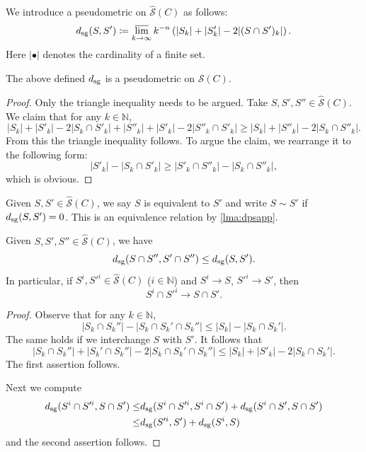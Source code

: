We introduce a pseudometric on $\hat{\mathcal{S}}(C)$ as follows:
\begin{equation}\label{eq:dsgdefapp}
d_{\mathrm{sg}}(S,S')\coloneqq \varlimsup_{k\to\infty} k^{-n} \left(|S_k|+|S'_k|-2|(S\cap S')_k|\right).
\end{equation}
Here $|\bullet|$ denotes the cardinality of a finite set.
\begin{lemma}\label{lma:dpsapp}
    The above defined $d_{\mathrm{sg}}$ is a pseudometric on $\hat{\mathcal{S}}(C)$.
\end{lemma}
\begin{proof}
    Only the triangle inequality needs to be argued. Take $S,S',S''\in \hat{\mathcal{S}}(C)$. We claim that for any $k\in \mathbb{N}$,
    \[
    |S_k|+|S'_k|-2|S_k\cap S'_k|+|S''_k|+|S'_k|-2|S''_k\cap S'_k|\geq |S_k|+|S''_k|-2|S_k\cap S''_k|.
    \]
    From this the triangle inequality follows. To argue the claim, we rearrange it to the following form:
    \[
        |S'_k|-|S_k\cap S'_k| \geq |S'_k\cap S''_k|-|S_k\cap S''_k|,
    \]
    which is obvious.
\end{proof}
Given $S,S'\in \hat{\mathcal{S}}(C)$, we say $S$ is equivalent to $S'$ and write $S\sim S'$ if $d_{\mathrm{sg}}(S,S')=0$. This is an equivalence relation by \cref{lma:dpsapp}.

\begin{lemma}\label{lma:dBilapp}
    Given $S,S',S''\in \hat{\mathcal{S}}(C)$, we have
    \[
    d_{\mathrm{sg}}(S\cap S'',S'\cap S'')\leq d_{\mathrm{sg}}(S,S').
    \]
    In particular, if $S^i,S'^i\in \hat{\mathcal{S}}(C)$ ($i\in \mathbb{N}$) and $S^i\to S$, $S'^i\to S'$, then
    \[
    S^i\cap S'^i\to S\cap S'.
    \]
\end{lemma}
\begin{proof}
    Observe that for any $k\in \mathbb{N}$,
    \[
    |S_k\cap S_k''|-|S_k\cap S_k'\cap S_k''|\leq |S_k|-|S_k\cap S_k'|.
    \]
    The same holds if we interchange $S$ with $S'$. It follows that
    \[
    |S_k\cap S_k''|+|S_k'\cap S_k''|-2|S_k\cap S_k'\cap S_k''|\leq |S_k|+|S'_k|-2|S_k\cap S_k'|.
    \]
    The first assertion follows.

    Next we compute
    \[
    \begin{split}
    d_{\mathrm{sg}}(S^i\cap S'^i,S\cap S')\leq & d_{\mathrm{sg}}(S^i\cap S'^i,S^i\cap S')+d_{\mathrm{sg}}(S^i\cap S',S\cap S')\\
    \leq & d_{\mathrm{sg}}(S'^i,S')+d_{\mathrm{sg}}(S^i,S)
    \end{split}
    \]
    and the second assertion follows.
\end{proof}

